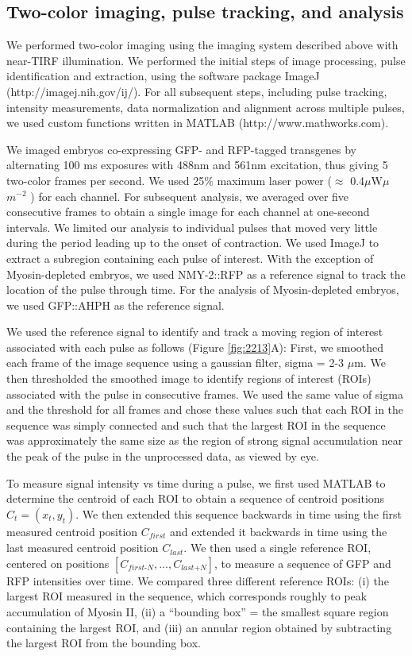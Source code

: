 \subsection{Two-color imaging, pulse tracking, and analysis}
We performed two-color imaging using the imaging system described above with near-TIRF illumination. We performed the initial steps of image processing, pulse identification and extraction, using the software package ImageJ (http://imagej.nih.gov/ij/). For all subsequent steps, including pulse tracking,  intensity measurements, data normalization and alignment across multiple pulses, we used custom functions written in MATLAB (http://www.mathworks.com).


We imaged embryos co-expressing GFP- and RFP-tagged transgenes by alternating 100 ms exposures with 488nm and 561nm excitation,  thus giving 5 two-color frames per second. We used 25$\%$ maximum laser power ($\approx$ 0.4$\mu$W$\mu$ $m^{-2}$ ) for each channel. For subsequent analysis,  we averaged over five consecutive frames to obtain a single image for each channel at one-second intervals. We limited our analysis to individual pulses that moved very little during the period leading up to the onset of contraction. We used ImageJ to extract a subregion containing each pulse of interest. With the exception of Myosin-depleted embryos, we used NMY-2::RFP as a reference signal to track the location of the pulse through time. For the analysis of Myosin-depleted embryos, we used GFP::AHPH as the reference signal.


We used the reference signal to identify and track a moving region of interest associated with each pulse as follows (Figure \ref{fig:2213}A):  First, we smoothed each frame of the image sequence using a gaussian filter, sigma = 2-3 $\mu$m. We then thresholded the smoothed image to identify regions of interest (ROIs) associated with the pulse in consecutive frames. We used the same value of sigma and the threshold for all frames and chose these values such that each ROI in the sequence was simply connected and such that the largest ROI in the sequence was approximately the same size as the region of strong signal accumulation near the peak of the pulse in the unprocessed data, as viewed by eye.  





To measure signal intensity vs time during a pulse, we first used MATLAB to determine the centroid of each ROI to obtain a sequence of centroid positions $C_{t} = (x_{t},y_{t})$.  We then extended this sequence backwards in time using the first measured centroid position $C_{\textit{first}}$ and extended it backwards in time using the last measured centroid position $C_{\textit{last}}$.  We then used a single reference ROI, centered on positions $[C_{\textit{first-N}},...,C_{\textit{last+N}}]$, to measure a sequence of GFP and RFP intensities over time.  We compared three different reference ROIs: (i) the largest ROI measured in the sequence, which corresponds roughly to peak accumulation of Myosin II, (ii)  a “bounding box” = the smallest square region containing the largest ROI, and (iii) an annular region obtained by subtracting the largest ROI from the bounding box.



